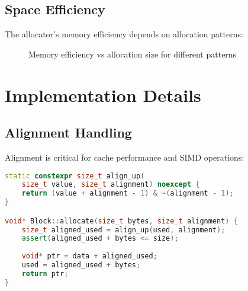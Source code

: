 \documentclass[11pt,a4paper]{article}
\begin{document}
\subsection{Space Efficiency}

The allocator's memory efficiency depends on allocation patterns:

\begin{figure}[h]
\centering
{}
\caption{Memory efficiency vs allocation size for different patterns}
\label{fig:efficiency}
\end{figure}

\section{Implementation Details}

\subsection{Alignment Handling}

Alignment is critical for cache performance and SIMD operations:

\begin{lstlisting}[language=C++, caption=Alignment implementation]
static constexpr size_t align_up(
    size_t value, size_t alignment) noexcept {
    return (value + alignment - 1) & ~(alignment - 1);
}

void* Block::allocate(size_t bytes, size_t alignment) {
    size_t aligned_used = align_up(used, alignment);
    assert(aligned_used + bytes <= size);
    
    void* ptr = data + aligned_used;
    used = aligned_used + bytes;
    return ptr;
}
\end{lstlisting}
\end{document}
